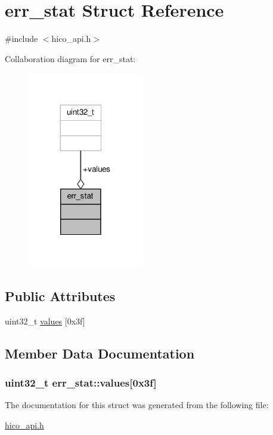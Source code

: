 \hypertarget{structerr__stat}{}\section{err\+\_\+stat Struct Reference}
\label{structerr__stat}


{\ttfamily \#include $<$hico\+\_\+api.\+h$>$}



Collaboration diagram for err\+\_\+stat\+:\nopagebreak
\begin{figure}[H]
\begin{center}
\leavevmode
\includegraphics[width=144pt]{structerr__stat__coll__graph}
\end{center}
\end{figure}
\subsection*{Public Attributes}
\begin{DoxyCompactItemize}
\item 
uint32\+\_\+t \hyperlink{structerr__stat_a659e627af5963248da109c8e2404cd08}{values} \mbox{[}0x3f\mbox{]}
\end{DoxyCompactItemize}


\subsection{Member Data Documentation}
\subsubsection[{\texorpdfstring{values}{values}}]{\setlength{\rightskip}{0pt plus 5cm}uint32\+\_\+t err\+\_\+stat\+::values\mbox{[}0x3f\mbox{]}}\hypertarget{structerr__stat_a659e627af5963248da109c8e2404cd08}{}\label{structerr__stat_a659e627af5963248da109c8e2404cd08}


The documentation for this struct was generated from the following file\+:\begin{DoxyCompactItemize}
\item 
\hyperlink{hico__api_8h}{hico\+\_\+api.\+h}\end{DoxyCompactItemize}
